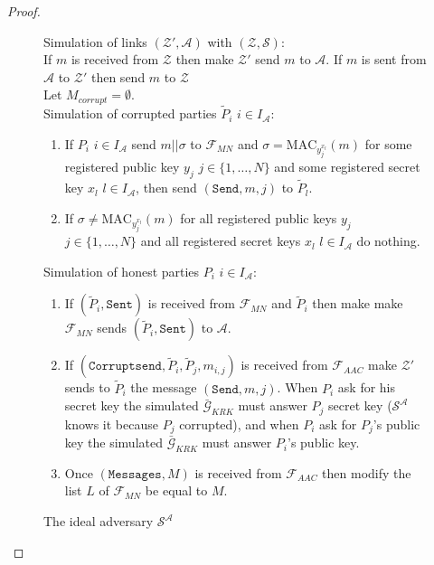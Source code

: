 \documentclass{acm_proc_article-sp}
\begin{document}
\begin{proof}
\begin{figure}
{\begin{minipage}[t]{1\columnwidth}
Simulation of links $(\mathcal{Z}', \mathcal{A})$ with $(\mathcal{Z}, \mathcal{S})$:\\
If $m$ is received from $\mathcal{Z}$ then make $\mathcal{Z}'$ send $m$ to $\mathcal{A}$.
If $m$ is sent from $\mathcal{A}$ to $\mathcal{Z}'$ then send $m$ to $\mathcal{Z}$\\
Let $M_{corrupt} = \emptyset$.\\

Simulation of corrupted parties $\tilde{P}_i$ $i \in I_\mathcal{A}$:

\begin{enumerate}
\item If $P_i$ $i \in I_\mathcal{A}$ send $m||\sigma$ to $\mathcal{F}_{MN}$ and
      $\sigma = \textrm{MAC}_{y_j^{x_l}}(m)$ for some registered public key $y_j$ $j \in \{1, \ldots, N\}$
      and some registered secret key $x_l$ $l \in I_\mathcal{A}$, then send
      $(\mathtt{Send}, m, j)$ to $\tilde{P}_l$.
\item If $\sigma \neq \textrm{MAC}_{y_j^{x_l}}(m)$ for all
      registered public keys $y_j$ $j \in \{1, \ldots, N\}$ and all registered secret keys $x_l$
      $l \in I_\mathcal{A}$ do nothing.
\end{enumerate}

Simulation of honest parties $P_i$ $i \in I_\mathcal{A}$:
\begin{enumerate}
   
    \item If  $(\tilde{P}_i, \mathtt{Sent})$ is received from $\mathcal{F}_{MN}$ and $\tilde{P}_i$
          then make make $\mathcal{F}_{MN}$ sends
          $(\tilde{P}_i, \mathtt{Sent})$ to $\mathcal{A}$.
    \item If $(\texttt{Corruptsend}, \tilde{P}_i , \tilde{P}_j , m_{i,j})$ is received from $\mathcal{F}_{AAC}$
          make $\mathcal{Z'}$ sends to $\tilde{P}_i$ the message $(\mathtt{Send}, m, j)$. When $P_i$ ask for his
          secret key the simulated $\bar{\mathcal{G}}_{KRK}$ must answer $P_j$ secret key ($\mathcal{S^A}$
          knows it because $P_j$ corrupted), and when $P_i$ ask for $P_j$'s public key the simulated
          $\bar{\mathcal{G}}_{KRK}$ must answer $P_i$'s public key.
    \item Once $(\mathtt{Messages}, M)$ is received from $\mathcal{F}_{AAC}$ then modify the list
          $L$ of $\mathcal{F}_{MN}$ be equal to $M$.
\end{enumerate}
\end{minipage}}
\caption{The ideal adversary $\mathcal{S^A}$}
\label{adv_S_A}
\end{figure}


\end{proof}
\end{document}

